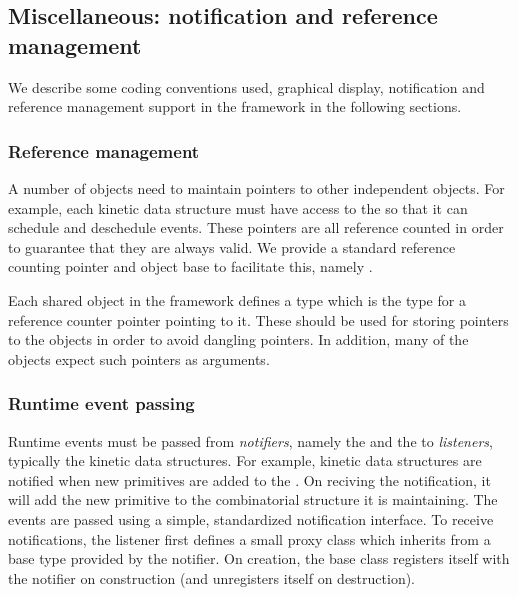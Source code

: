 \subsection{Miscellaneous: notification and reference management\label{sec:kds_misc}}


We describe some coding conventions used, graphical display,
notification and reference management support in the framework in the
following sections.


\subsubsection{Reference management}

A number of objects need to maintain pointers to other independent
objects. For example, each kinetic data structure must have access to
the  so that it can schedule and deschedule
events. These pointers are all reference counted in order to guarantee
that they are always valid. We provide a standard reference counting
pointer and object base to facilitate this, namely
.

Each shared object in the framework defines a type  which is the
type for a reference counter pointer pointing to it. These should be
used for storing pointers to the objects in order to avoid dangling
pointers. In addition, many of the objects expect such pointers as
arguments.

\subsubsection{Runtime event passing\label{sec:kds_listener}}


Runtime events must be passed from \textit{notifiers}, namely the
 and the  to
\textit{listeners}, typically the kinetic data structures. For
example, kinetic data structures are notified when new primitives are
added to the . On reciving the
notification, it will add the new primitive to the combinatorial
structure it is maintaining. The events are passed using a simple,
standardized notification interface. To receive notifications, the
listener first defines a small proxy class which inherits from a
 base type provided by the notifier. On creation, the
 base class registers itself with the notifier on
construction (and unregisters itself on destruction).

